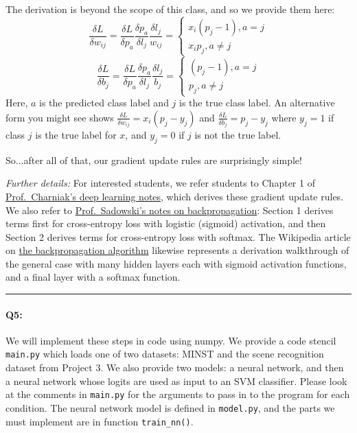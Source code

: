 The derivation is beyond the scope of this class, and so we provide them here:
\begin{equation}
\frac{\delta L}{\delta w_{ij}} = \frac{\delta L}{\delta p_a} \frac{\delta p_a}{\delta l_j} \frac{\delta l_j}{w_{ij}} =\begin{cases}
x_i(p_j-1), a = j\\
x_ip_j,  a\neq j
\end{cases}
\label{eq:wupdate}
\end{equation}
\begin{equation}
\frac{\delta L}{\delta b_j} = \frac{\delta L}{\delta p_a} \frac{\delta p_a}{\delta l_j} \frac{\delta l_j}{b_j} =\begin{cases}
(p_j-1), a = j\\
p_j,  a\neq j
\end{cases}
\label{eq:bupdate}
\end{equation}
Here, $a$ is the predicted class label and $j$ is the true class label. An alternative form you might see shows $\frac{\delta L}{\delta w_{ij}} = x_i(p_j-y_j)$ and $\frac{\delta L}{\delta b_j} = p_j-y_j$ where $y_j=1$ if class $j$ is the true label for $x$, and $y_j = 0$ if $j$ is not the true label.

So...after all of that, our gradient update rules are surprisingly simple!

\emph{Further details:} For interested students, we refer students to Chapter 1 of \href{https://cs.brown.edu/courses/csci1460/assets/files/deep-learning.pdf}{Prof.~Charniak's deep learning notes}, which derives these gradient update rules. We also refer to \href{https://www.ics.uci.edu/~pjsadows/notes.pdf}{Prof.~Sadowski's notes on backpropagation}: Section 1 derives terms first for cross-entropy loss with logistic (sigmoid) activation, and then Section 2 derives terms for cross-entropy loss with softmax. The Wikipedia article on \href{https://en.wikipedia.org/wiki/Backpropagation}{the backpropagation algorithm} likewise represents a derivation walkthrough of the general case with many hidden layers each with sigmoid activation functions, and a final layer with a softmax function.

\hspace{\fill}\rule{0.5\linewidth}{.5pt}\hspace{\fill}


\paragraph{Q5:} We will implement these steps in code using numpy. We provide a code stencil \texttt{main.py} which loads one of two datasets: MINST and the scene recognition dataset from Project 3. We also provide two models: a neural network, and then a neural network whose logits are used as input to an SVM classifier. Please look at the comments in \texttt{main.py} for the arguments to pass in to the program for each condition. The neural network model is defined in \texttt{model.py}, and the parts we must implement are in function \texttt{train\_nn()}. 

